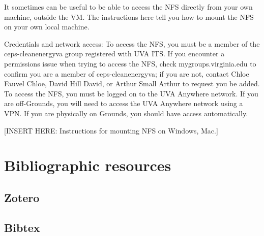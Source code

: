 \documentclass[
]{book}
\begin{document}
It sometimes can be useful to be able to access the NFS directly from your own machine, outside the VM. The instructions here tell you how to mount the NFS on your own local machine.

Credentials and network access:
To access the NFS, you must be a member of the ceps-cleanenergyva group registered with UVA ITS. If you encounter a permissions issue when trying to access the NFS, check mygroups.virginia.edu to confirm you are a member of ceps-cleanenergyva; if you are not, contact Chloe Fauvel Chloe, David Hill David, or Arthur Small Arthur to request you be added.
To access the NFS, you must be logged on to the UVA Anywhere network. If you are off-Grounds, you will need to access the UVA Anywhere network using a VPN. If you are physically on Grounds, you should have access automatically.

{[}INSERT HERE: Instructions for mounting NFS on Windows, Mac.{]}

\hypertarget{bibliographic-resources}{%
\chapter{Bibliographic resources}\label{bibliographic-resources}}

\hypertarget{zotero}{%
\section{Zotero}\label{zotero}}

\hypertarget{bibtex}{%
\section{Bibtex}\label{bibtex}}

  
\end{document}
